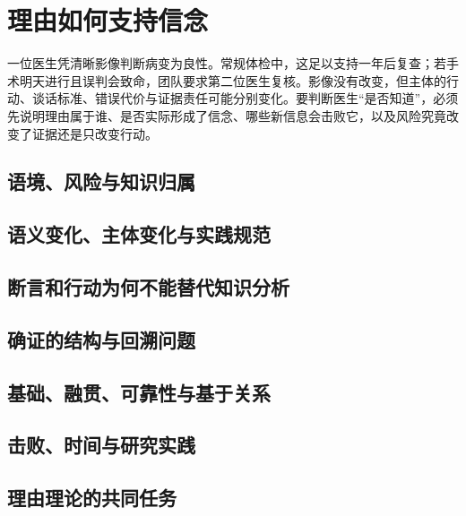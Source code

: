 \chapter{理由如何支持信念}

\begin{openingcase}
一位医生凭清晰影像判断病变为良性。常规体检中，这足以支持一年后复查；若手术明天进行且误判会致命，团队要求第二位医生复核。影像没有改变，但主体的行动、谈话标准、错误代价与证据责任可能分别变化。要判断医生“是否知道”，必须先说明理由属于谁、是否实际形成了信念、哪些新信息会击败它，以及风险究竟改变了证据还是只改变行动。
\end{openingcase}

\section{语境、风险与知识归属}


\section{语义变化、主体变化与实践规范}


\section{断言和行动为何不能替代知识分析}



\section{确证的结构与回溯问题}


\section{基础、融贯、可靠性与基于关系}


\section{击败、时间与研究实践}



\section{理由理论的共同任务}


